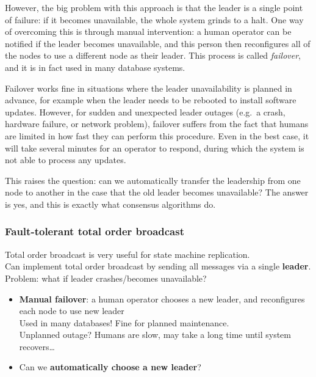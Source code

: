 However, the big problem with this approach is that the leader is a single point of failure: if it becomes unavailable, the whole system grinds to a halt.
One way of overcoming this is through manual intervention: a human operator can be notified if the leader becomes unavailable, and this person then reconfigures all of the nodes to use a different node as their leader.
This process is called \emph{failover}, and it is in fact used in many database systems.

Failover works fine in situations where the leader unavailability is planned in advance, for example when the leader needs to be rebooted to install software updates.
However, for sudden and unexpected leader outages (e.g.\ a crash, hardware failure, or network problem), failover suffers from the fact that humans are limited in how fast they can perform this procedure.
Even in the best case, it will take several minutes for an operator to respond, during which the system is not able to process any updates.

This raises the question: can we automatically transfer the leadership from one node to another in the case that the old leader becomes unavailable?
The answer is yes, and this is exactly what consensus algorithms do.


\begin{frame}
    \label{s:failover}
    \frametitle{Fault-tolerant total order broadcast}
    Total order broadcast is very useful for state machine replication.\\[0.5em]
    Can implement total order broadcast by sending all messages via a single \textbf{leader}.\\[0.5em]
    Problem: what if leader crashes/becomes unavailable?\\\pause
    \begin{itemize}
        \item \textbf{Manual failover}: a human operator chooses a new leader, and reconfigures each node to use new leader\\[0.5em]
            Used in many databases! Fine for planned maintenance.\\[0.5em]\pause
            Unplanned outage? Humans are slow, may take a long time until system recovers\dots\\[0.5em]\pause
        \item Can we \textbf{automatically choose a new leader}?
    \end{itemize}
\end{frame}
\label{l:failover}

